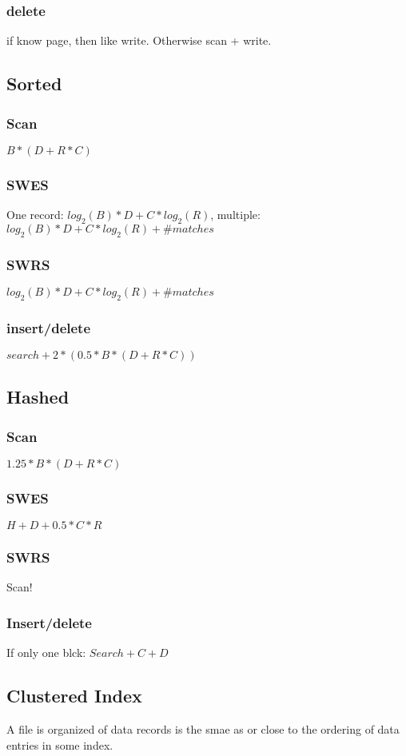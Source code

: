 \documentclass[a4paper]{scrartcl}
\begin{document}
    \subsubsection{delete}
      if know page, then like write. Otherwise scan + write.
  \subsection{Sorted}
    \subsubsection{Scan}
      $B * (D + R * C)$
    \subsubsection{SWES}
      One record: $log_2(B) * D + C * log_2(R)$,
      multiple: $log_2(B) * D + C * log_2(R) + \#matches$
    \subsubsection{SWRS}
      $log_2(B) * D + C * log_2(R) + \#matches$
    \subsubsection{insert/delete}
      $search + 2 * (0.5 * B * (D + R * C))$
  \subsection{Hashed}
    \subsubsection{Scan}
      $1.25 * B * (D + R * C)$
    \subsubsection{SWES}
      $H + D + 0.5 * C * R$
    \subsubsection{SWRS}
      Scan!
    \subsubsection{Insert/delete}
      If only one blck: $Search + C + D$
  \subsection{Clustered Index}
    A file is organized of data records is the smae as or close to the ordering of data entries in some index.
\end{document}
